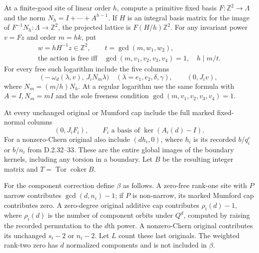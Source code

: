 At a finite-good site of linear order $h$, compute
a primitive fixed basis $F:\mathbb Z^2\to\Lambda$
and the norm $N_h=I+\cdots+A^{h-1}$. If $H$ is an
integral basis matrix for the image of
$F^{-1}N_h:\Lambda\to\mathbb Z^2$, the projected lattice
is $F(H/h)\mathbb Z^2$. For any invariant power
$v=Fz$ and order $m=hk$, put
\[
 \begin{gathered}
 w=hH^{-1}z\in\mathbb Z^2,\qquad t=\gcd(m,w_1,w_2),\\
 \text{the action is free iff}\quad
 \gcd(m,v_1,v_2,v_3,v_4)=1,\quad h\mid m/t.
 \end{gathered}
                                                               \tag{D.WP5}
\]
For every free such logarithm include the five columns
\[
 \bigl(-\omega_d(\lambda,v),\,J_iN_m\lambda\bigr)
       \quad(\lambda=e_1,e_2,\delta,\gamma),\qquad
                         (0,J_iv),                       \tag{D.WP6}
\]
where $N_m=(m/h)N_h$. At a regular logarithm use the
same formula with $A=I,N_m=mI$ and the sole freeness
condition $\gcd(m,v_1,v_2,v_3,v_4)=1$.

At every unchanged original or Mumford cap include
the full marked fixed-normal columns
\[
                       (0,J_iF_i),\qquad
                   F_i\text{ a basis of }\ker(A_i(d)-I).
                                                               \tag{D.WP7}
\]
For a nonzero-Chern original also include
$(dh_i,0)$, where $h_i$ is its recorded
$b/q_i^c$ or $b/n_i$ from D.2.32--33.
These are the entire global images of the boundary
kernels, including any torsion in a boundary.
Let $B$ be the resulting integer matrix and
$T=\operatorname{Tor}\operatorname{coker}B$.

For the component correction define $\beta$ as follows.
A zero-free rank-one site with $P$ narrow contributes
$\gcd(d,n_i)-1$; if $P$ is non-narrow, its marked
Mumford cap contributes zero. A zero-degree original
additive cap contributes $\rho_i(d)-1$, where
$\rho_i(d)$ is the number of component orbits under
$Q^d$, computed by raising the recorded permutation
to the $d$th power. A nonzero-Chern original contributes
its unchanged $s_i-2$ or $n_i-2$.
Let $L$ count these last originals. The weighted
rank-two zero has $d$ normalized components and is
not included in $\beta$.


